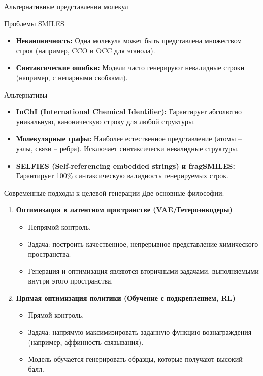 \documentclass{beamer}
\begin{document}
\begin{frame}{Альтернативные представления молекул}
    \begin{block}{Проблемы SMILES}
        \begin{itemize}
            \item \textbf{Неканоничность:} Одна молекула может быть представлена множеством строк (например, CCO и OCC для этанола).
            \item \textbf{Синтаксические ошибки:} Модели часто генерируют невалидные строки (например, с непарными скобками).
        \end{itemize}
    \end{block}

    \begin{block}{Альтернативы}
        \begin{itemize}
            \item \textbf{InChI (International Chemical Identifier):} Гарантирует абсолютно уникальную, каноническую строку для любой структуры.
            \item \textbf{Молекулярные графы:} Наиболее естественное представление (атомы -- узлы, связи -- ребра). Исключает синтаксически невалидные структуры.
            \item \textbf{SELFIES (Self-referencing embedded strings) и fragSMILES:} Гарантирует 100\% синтаксическую валидность генерируемых строк.
        \end{itemize}
    \end{block}
\end{frame}

\begin{frame}{Современные подходы к целевой генерации}
    Две основные философии:
    \begin{enumerate}
        \item \textbf{Оптимизация в латентном пространстве (VAE/Гетероэнкодеры)}
        \begin{itemize}
            \item Непрямой контроль.
            \item Задача: построить качественное, непрерывное представление химического пространства.
            \item Генерация и оптимизация являются вторичными задачами, выполняемыми внутри этого пространства.
        \end{itemize}
        \vspace{0.5cm}
        \item \textbf{Прямая оптимизация политики (Обучение с подкреплением, RL)}
        \begin{itemize}
            \item Прямой контроль.
            \item Задача: напрямую максимизировать заданную функцию вознаграждения (например, аффинность связывания).
            \item Модель обучается генерировать образцы, которые получают высокий балл.
        \end{itemize}
    \end{enumerate}
    \centering
\end{frame}
\end{document}
